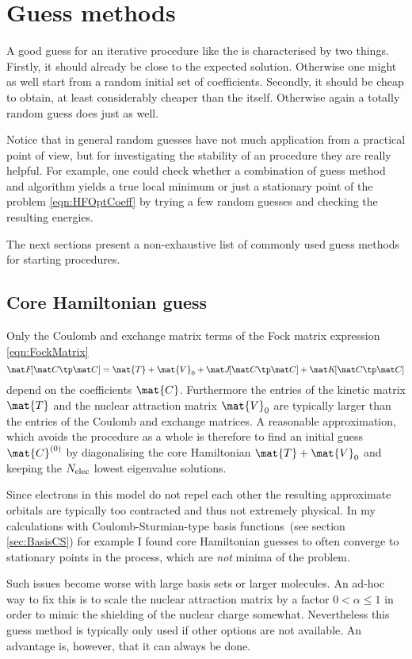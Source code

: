 \section{Guess methods}
\label{sec:ScfGuesses}
A good guess for an iterative procedure like the \SCF
is characterised by two things.
Firstly, it should already be close to the expected solution.
Otherwise one might as well start from a random initial set of coefficients.
Secondly, it should be cheap to obtain,
at least considerably cheaper than the \SCF itself.
Otherwise again a totally random guess does just as well.

Notice that in general random guesses have not much application
from a practical point of view,
but for investigating the stability of an \SCF procedure
they are really helpful.
For example, one could check whether a combination of guess method
and \SCF algorithm yields a true local minimum or just a stationary
point of the \HF problem \eqref{eqn:HFOptCoeff}
by trying a few random guesses and checking the resulting energies.

The next sections present a non-exhaustive list of
commonly used guess methods for starting \SCF procedures.

\subsection{Core Hamiltonian guess}
\label{sec:CoreHamiltonian}
Only the Coulomb and exchange matrix terms of the Fock matrix
expression \eqref{eqn:FockMatrix}
\[ \matFfull = \mat{T} + \mat{V}_0 + \matJfull + \matKfull \]
depend on the coefficients $\mat{C}$.
Furthermore the entries of the kinetic matrix $\mat{T}$
and the nuclear attraction matrix $\mat{V}_0$
are typically larger than the entries of the Coulomb and exchange matrices.
A reasonable approximation,
which avoids the \SCF procedure as a whole
is therefore to find an initial guess $\mat{C}^{(0)}$
by diagonalising the core Hamiltonian $\mat{T} + \mat{V}_0$
and keeping the $N_\text{elec}$ lowest eigenvalue solutions.

Since electrons in this model do not repel each other
the resulting approximate orbitals are typically too contracted
and thus not extremely physical.
In my calculations with Coulomb-Sturmian-type
basis functions~(see section \ref{sec:BasisCS})
for example I found core Hamiltonian guesses to often
converge to stationary points in the \SCF process,
which are \emph{not} minima of the \HF problem.

Such issues become worse with large basis sets or larger molecules.
An ad-hoc way to fix this is to scale the nuclear attraction
matrix by a factor $0 < \alpha \leq 1$
in order to mimic the shielding of the nuclear charge somewhat.
Nevertheless this guess method is typically only used
if other options are not available.
An advantage is, however, that it can always be done.

